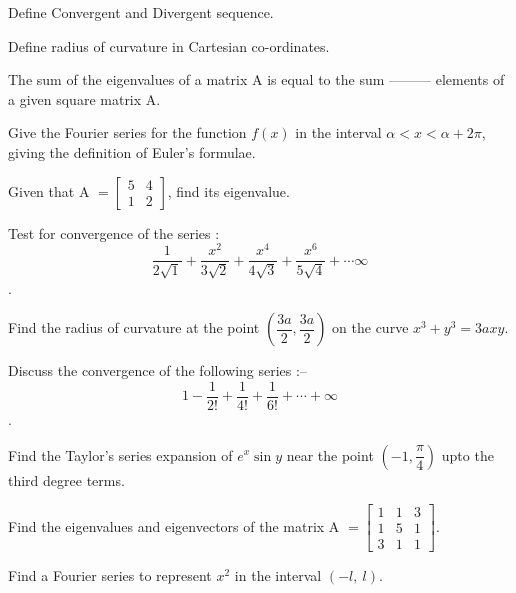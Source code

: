 \markC
\ene

\newpage

\sub{\subject}
\maxtime

\partA

\iitem Define Convergent and Divergent sequence.
\item Define radius of curvature in Cartesian co-ordinates.
\item The sum of the eigenvalues of a matrix A is equal to the sum ---------
  elements of a given square matrix A.

\item Give the Fourier series for the function $f(x)$ in the interval $\alpha < x <
  \alpha + 2\pi $, giving the definition of Euler's formulae.
\item Given that A $ = \begin{bmatrix}
      5 & 4\\
      1 & 2
\end{bmatrix}$, find its eigenvalue.

\markA
\partB

\item Test for convergence of the series :
  \[ \frac{1}{2\sqrt{1}} + \frac{x^2}{3\sqrt{2}} + \frac{x^4}{4\sqrt{3}} +
  \frac{x^6}{5\sqrt{4}} + \cdots  \infty \].
\item Find the radius of curvature at the point $\left( \dfrac{3a}{2}, \dfrac{3a}{2} \right)$ on the curve
  $x^3 + y^3 = 3axy$.
\item Discuss the convergence of the following series :--
  \[ 1 - \frac{1}{2!} + \frac{1}{4!} + \frac{1}{6!} + \cdots + \infty \].
\item Find the Taylor's series expansion of $e^x \sin y $ near the point
  $\left(-1,\dfrac{\pi}{4}\right)$ upto the third degree terms.

\newpage \again

\item Find the eigenvalues and eigenvectors of the matrix A $ = \begin{bmatrix}
      1 & 1 & 3\\
      1 & 5 & 1\\
      3 & 1 & 1
\end{bmatrix}$.
\item Find a Fourier series to represent $x^2$ in the interval $( -l,\ l )$.

\markB
\partCo

